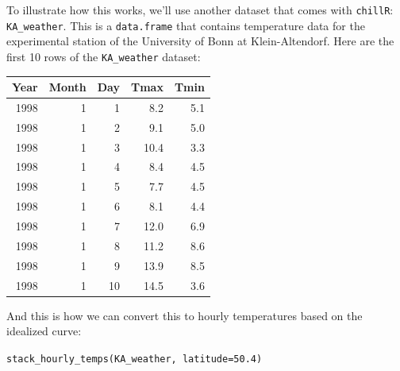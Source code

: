 \documentclass[
]{book}
\begin{document}
To illustrate how this works, we'll use another dataset that comes with \texttt{chillR}: \texttt{KA\_weather}. This is a \texttt{data.frame} that contains temperature data for the experimental station of the University of Bonn at Klein-Altendorf. Here are the first 10 rows of the \texttt{KA\_weather} dataset:

\begingroup\fontsize{10}{12}\selectfont

\begin{tabular}{r|r|r|r|r}
\hline
Year & Month & Day & Tmax & Tmin\\
\hline
1998 & 1 & 1 & 8.2 & 5.1\\
\hline
1998 & 1 & 2 & 9.1 & 5.0\\
\hline
1998 & 1 & 3 & 10.4 & 3.3\\
\hline
1998 & 1 & 4 & 8.4 & 4.5\\
\hline
1998 & 1 & 5 & 7.7 & 4.5\\
\hline
1998 & 1 & 6 & 8.1 & 4.4\\
\hline
1998 & 1 & 7 & 12.0 & 6.9\\
\hline
1998 & 1 & 8 & 11.2 & 8.6\\
\hline
1998 & 1 & 9 & 13.9 & 8.5\\
\hline
1998 & 1 & 10 & 14.5 & 3.6\\
\hline
\end{tabular}
\endgroup{}

And this is how we can convert this to hourly temperatures based on the idealized curve:

\texttt{stack\_hourly\_temps(KA\_weather,\ latitude=50.4)}

\begingroup\fontsize{10}{12}\selectfont
\end{document}
